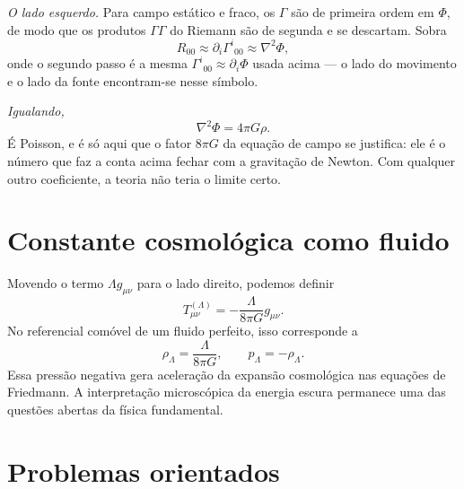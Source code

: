 \documentclass[12pt,a4paper,oneside]{book}
\theoremstyle{rgplain}
\theoremstyle{rgremark}
\begin{document}
\emph{O lado esquerdo.} Para campo estático e fraco, os $\Gamma$ são de
primeira ordem em $\Phi$, de modo que os produtos $\Gamma\Gamma$ do Riemann
são de segunda e se descartam. Sobra
\[
  R_{00}\approx\partial_i\Gamma^i{}_{00}\approx\nabla^2\Phi ,
\]
onde o segundo passo é a mesma $\Gamma^i{}_{00}\approx\partial_i\Phi$ usada
acima --- o lado do movimento e o lado da fonte encontram-se nesse símbolo.

\emph{Igualando,}
\begin{equation}
  \nabla^2\Phi=4\pi G\rho .
  \label{eq:poisson-recuperada}
\end{equation}
É Poisson, e é só aqui que o fator $8\pi G$ da equação de campo se justifica:
ele é o número que faz a conta acima fechar com a gravitação de Newton. Com
qualquer outro coeficiente, a teoria não teria o limite certo.

\section{Constante cosmológica como fluido}

Movendo o termo $\Lambda g_{\mu\nu}$ para o lado direito, podemos definir
\[
  T^{(\Lambda)}_{\mu\nu}=-\frac{\Lambda}{8\pi G}g_{\mu\nu}.
\]
No referencial comóvel de um fluido perfeito, isso corresponde a
\[
  \rho_\Lambda=\frac{\Lambda}{8\pi G},
  \qquad
  p_\Lambda=-\rho_\Lambda.
\]
Essa pressão negativa gera aceleração da expansão cosmológica nas equações de
Friedmann. A interpretação microscópica da energia escura permanece uma das
questões abertas da física fundamental.

\section{Problemas orientados}
\end{document}
